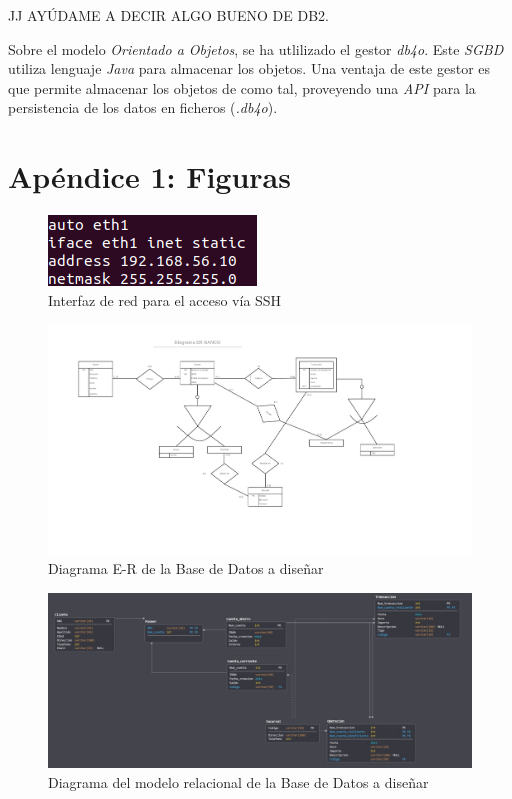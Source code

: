 \documentclass{article}
\begin{document}
\begin{Huge}
	JJ AYÚDAME A DECIR ALGO BUENO DE DB2.
\end{Huge}

Sobre el modelo \emph{Orientado a Objetos}, se ha utlilizado el gestor \emph{db4o}. Este \emph{SGBD} utiliza lenguaje \emph{Java} para almacenar los objetos. Una ventaja de este gestor es que permite almacenar los objetos de como tal, proveyendo una \emph{API} para la persistencia de los datos en ficheros (\emph{.db4o}).


\newpage
\section{Apéndice 1: Figuras}

\begin{figure}[h!]
	\centering
		\includegraphics[scale=1.5]{images/interfacesred.png}
			\caption{Interfaz de red para el acceso vía SSH}
		\label{FIG:interfacesRED}
\end{figure}

\begin{figure}[h!]
	\centering
		\includegraphics[scale=0.5]{images/diagramaer.png}
			\caption{Diagrama E-R de la Base de Datos a diseñar}
			\label{FIG:diagramaER}
\end{figure}

\begin{figure}[h!]
	\centering
		\includegraphics[scale=0.6]{images/diagramaRelacional.jpg}
			\caption{Diagrama del modelo relacional de la Base de Datos a diseñar}
			\label{FIG:diagramaRel}
\end{figure}
\end{document}

